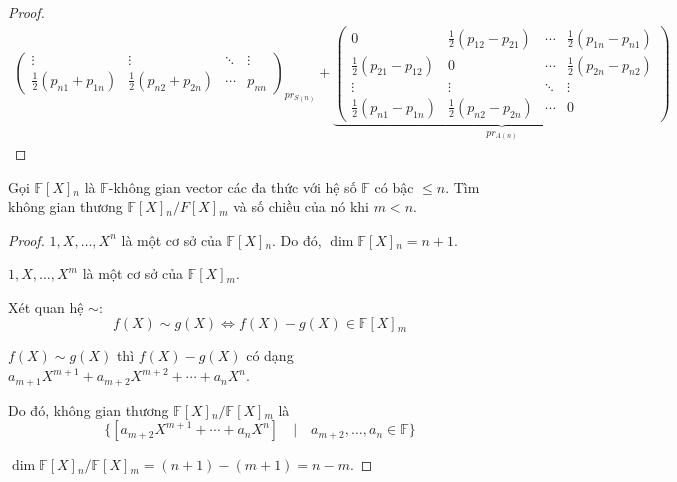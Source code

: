 \documentclass[class=linear-algebra,crop=false]{standalone}
\begin{document}
\begin{proof}
\begin{gather*}
{\begin{pmatrix}
                \vdots                       & \vdots                       & \ddots & \vdots                       \\
                \frac{1}{2}(p_{n1} + p_{1n}) & \frac{1}{2}(p_{n2} + p_{2n}) & \cdots & p_{nn}
            \end{pmatrix}
        }_{pr_{S(n)}}+
        \underbrace{
            \begin{pmatrix}
                0                            & \frac{1}{2}(p_{12} - p_{21}) & \cdots & \frac{1}{2}(p_{1n} - p_{n1}) \\
                \frac{1}{2}(p_{21} - p_{12}) & 0                            & \cdots & \frac{1}{2}(p_{2n} - p_{n2}) \\
                \vdots                       & \vdots                       & \ddots & \vdots                       \\
                \frac{1}{2}(p_{n1} - p_{1n}) & \frac{1}{2}(p_{n2} - p_{2n}) & \cdots & 0
            \end{pmatrix}
        }_{pr_{A(n)}}
    \end{gather*}
\end{proof}

\begin{exercise}
    Gọi $\mathbb{F}[X]{}_{n}$ là $\mathbb{F}$-không gian vector các đa thức với hệ số $\mathbb{F}$ có bậc $\le n$. Tìm không gian thương $\mathbb{F}[X]{}_{n}/F[X]{}_{m}$ và số chiều của nó khi $m < n$.
\end{exercise}

\begin{proof}
    $1, X, \ldots, X^{n}$ là một cơ sở của $\mathbb{F}[X]{}_{n}$. Do đó, $\dim \mathbb{F}[X]{}_{n} = n + 1$.
    \par $1, X, \ldots, X^{m}$ là một cơ sở của $\mathbb{F}[X]{}_{m}$.
    \par Xét quan hệ $\sim$:
    \[ f(X)\sim g(X) \Longleftrightarrow f(X) - g(X) \in \mathbb{F}[X]{}_{m} \]
    \par $f(X) \sim g(X)$ thì $f(X) - g(X)$ có dạng $a_{m+1}X^{m+1} + a_{m+2}X^{m+2} + \cdots + a_{n}X^{n}$.
    \par Do đó, không gian thương $\mathbb{F}[X]{}_{n}/\mathbb{F}[X]{}_{m}$ là
    \[ \{ [a_{m+2}X^{m+1} + \cdots + a_{n}X^{n}] \quad\vert\quad a_{m+2}, \ldots, a_{n}\in\mathbb{F} \} \]
    \par $\dim\mathbb{F}[X]{}_{n}/\mathbb{F}[X]{}_{m} = (n + 1) - (m + 1) = n - m$.
\end{proof}
\end{document}
